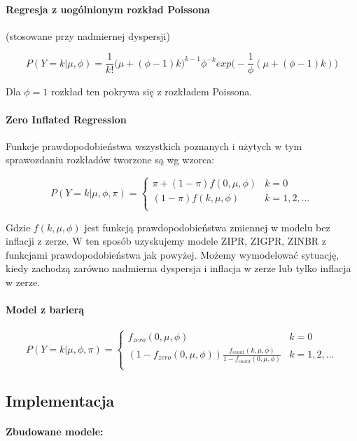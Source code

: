 \documentclass[a4paper,11pt]{article}
\begin{document}
\paragraph{Regresja z uogólnionym rozkład Poissona} (stosowane przy nadmiernej dyspersji)

$$ P(Y=k|\mu, \phi) = \frac{1}{k!} \Big(\mu+ (\phi -1)k\Big)^{k-1} \phi^{-k} exp\Big(-\frac{1}{\phi}(\mu +  (\phi -1)k)   \Big) $$

Dla $\phi =  1$ rozkład ten pokrywa  się z rozkładem Poissona. 

\paragraph{Zero Inflated Regression}

Funkcje prawdopodobieństwa wszystkich poznanych i użytych w tym sprawozdaniu rozkładów tworzone są  wg wzorca:  

$$ P(Y=k|\mu, \phi, \pi) = \left\lbrace \begin{array}{ll}
\pi + (1-\pi)f(0,\mu, \phi) & k=0 \\
(1-\pi)f(k,\mu, \phi)& k = 1, 2, \ldots \\
\end{array}  $$ 

Gdzie $f(k,\mu, \phi)$ jest funkcją prawdopodobieństwa zmiennej w modelu bez inflacji z zerze. W ten sposób uzyskujemy modele ZIPR, ZIGPR, ZINBR z funkcjami prawdopodobieństwa jak powyżej. Możemy wymodelować sytuację, kiedy zachodzą zarówno nadmierna dyspersja i inflacja w zerze lub tylko inflacja  w zerze.  

\paragraph{Model z barierą}

$$ P(Y=k|\mu, \phi, \pi) = \left\lbrace \begin{array}{ll}
f_{zero}(0,\mu, \phi) & k=0 \\
(1- f_{zero}(0,\mu, \phi))\frac{f_{count}(k,\mu, \phi)}{1- f_{count}(0,\mu, \phi)}& k = 1, 2, \ldots \\
\end{array}  $$ 


\subsection{Implementacja}

\paragraph{Zbudowane modele:}
\end{document}
